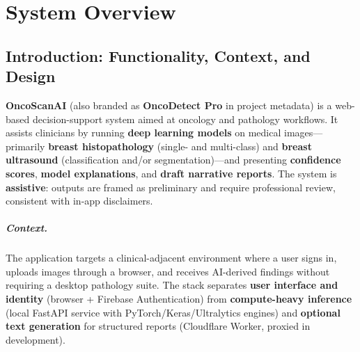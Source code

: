 % 

\chapter{System Overview}
\label{ch:system-overview}

\section{Introduction: Functionality, Context, and Design}

\textbf{OncoScanAI} (also branded as \textbf{OncoDetect Pro} in project metadata) is a web-based decision-support system aimed at oncology and pathology workflows. It assists clinicians by running \textbf{deep learning models} on medical images---primarily \textbf{breast histopathology} (single- and multi-class) and \textbf{breast ultrasound} (classification and/or segmentation)---and presenting \textbf{confidence scores}, \textbf{model explanations}, and \textbf{draft narrative reports}. The system is \textbf{assistive}: outputs are framed as preliminary and require professional review, consistent with in-app disclaimers.

\paragraph{Context.}
The application targets a clinical-adjacent environment where a user signs in, uploads images through a browser, and receives AI-derived findings without requiring a desktop pathology suite. The stack separates \textbf{user interface and identity} (browser + Firebase Authentication) from \textbf{compute-heavy inference} (local FastAPI service with PyTorch/Keras/Ultralytics engines) and \textbf{optional text generation} for structured reports (Cloudflare Worker, proxied in development).

